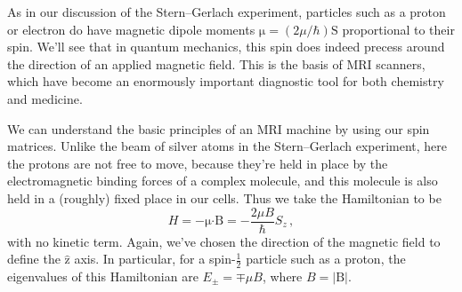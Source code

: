 \documentclass{article}
\theoremstyle{plain}\theoremheaderfont{\normalfont\itshape}\theorembodyfont{\rmfamily}\theoremseparator{.}\newtheorem*{rem}{Remark}\newtheorem*{ex}{Example}\newtheorem*{proof}{Proof}\newtheorem*{altp}{Alternative proof}
\theoremstyle{plain}\theoremheaderfont{\normalfont\bfseries}\theorembodyfont{\rmfamily}\theoremseparator{.}\newtheorem{thm}{Theorem}[section]\newtheorem{lem}[thm]{Lemma}\newtheorem{prop}[thm]{Proposition}\newtheorem*{cor}{Corollary}\newtheorem{defn}[thm]{Definition}\newtheorem{clm}[thm]{Claim}\newtheorem{clminproof}{Claim}
\theoremstyle{break}\theoremheaderfont{\normalfont\itshape}\theorembodyfont{\rmfamily}\theoremseparator{.\medskip}\newtheorem*{proofskip}{Proof}\newtheorem*{exs}{Examples}\newtheorem*{rems}{Remarks}
\theoremstyle{break}\theoremheaderfont{\normalfont\bfseries}\theorembodyfont{\rmfamily}\theoremseparator{.\medskip}\newtheorem{lemskip}[thm]{Lemma}\newtheorem{defnskip}[thm]{Definition}\newtheorem{propskip}[thm]{Proposition}\newtheorem{thmskip}[thm]{Theorem}
\numberwithin{equation}{section}
\newcommand{\vb}[1]{\bm{\mathrm{#1}}}
\newcommand{\vu}[1]{\hat{\bm{\mathrm{#1}}}}
\newcommand{\vdot}{\bm{\cdot}}
\newcommand{\abs}[1]{\left| #1 \right|}
\begin{document}
    As in our discussion of the Stern--Gerlach experiment, particles such as a proton or electron do have magnetic dipole moments \(\vb{\mu}=(2\mu/\hbar)\vb{S}\) proportional to their spin. We'll see that in quantum mechanics, this spin does indeed precess around the direction of an applied magnetic field. This is the basis of MRI scanners, which have become an enormously important diagnostic tool for both chemistry and medicine.

    We can understand the basic principles of an MRI machine by using our spin matrices. Unlike the beam of silver atoms in the Stern--Gerlach experiment, here the protons are not free to move, because they're held in place by the electromagnetic binding forces of a complex molecule, and this molecule is also held in a (roughly) fixed place in our cells. Thus we take the Hamiltonian to be
    \begin{equation}
        H=-\vb{\mu}\vdot\vb{B}=-\frac{2\mu B}{\hbar}S_z\,,
    \end{equation}
    with no kinetic term. Again, we've chosen the direction of the magnetic field to define the \(\vu{z}\) axis. In particular, for a spin-\(\frac{1}{2}\) particle such as a proton, the eigenvalues of this Hamiltonian are \(E_\pm=\mp\mu B\), where \(B=\abs{\vb{B}}\).
\end{document}
